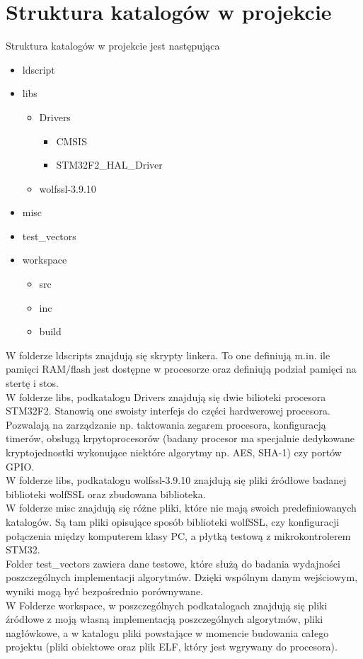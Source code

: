 \documentclass[oneside]{mgr}
\begin{document}
\section{Struktura katalogów w projekcie}

Struktura katalogów w projekcie jest następująca 
\begin{itemize}
\item{ldscript}
\item{libs}
\begin{itemize}
\item{Drivers}
\begin{itemize}
\item{CMSIS}
\item{STM32F2\_HAL\_Driver}
\end{itemize}
\item{wolfssl-3.9.10}
\end{itemize}
\item{misc}
\item{test\_vectors}
\item{workspace}
\begin{itemize}
\item{src}
\item{inc}
\item{build}
\end{itemize}
\end{itemize}

W folderze ldscripts znajdują się skrypty linkera. To one definiują m.in. ile pamięci RAM/flash jest dostępne w procesorze oraz definiują podział pamięci na stertę i stos.\\
W folderze libs, podkatalogu Drivers znajdują się dwie bilioteki procesora STM32F2. Stanowią one swoisty interfejs do części hardwerowej procesora. Pozwalają na zarządzanie np. taktowania zegarem procesora, konfiguracją timerów, obsługą krpytoprocesorów (badany procesor ma specjalnie dedykowane kryptojednostki wykonujące niektóre algorytmy np. AES, SHA-1) czy portów GPIO.\\
W folderze libs, podkatalogu wolfssl-3.9.10 znajdują się pliki źródłowe badanej biblioteki wolfSSL oraz zbudowana biblioteka.\\
W folderze misc znajdują się różne pliki, które nie mają swoich predefiniowanych katalogów. Są tam pliki opisujące sposób biblioteki wolfSSL, czy konfiguracji połączenia między komputerem klasy PC, a płytką testową z mikrokontrolerem STM32.\\
Folder test\_vectors zawiera dane testowe, które służą do badania wydajności poszczególnych implementacji algorytmów. Dzięki wspólnym danym wejściowym, wyniki mogą być bezpośrednio porównywane.\\
W Folderze workspace, w poszczególnych podkatalogach znajdują się pliki źródłowe z moją własną implementacją poszczególnych algorytmów, pliki nagłówkowe, a w katalogu pliki powstające w momencie budowania całego projektu (pliki obiektowe oraz plik ELF, który jest wgrywany do procesora).
\end{document}
